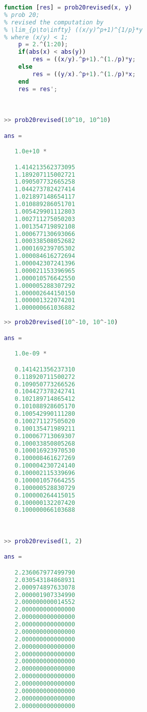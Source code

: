 \begin{lstlisting}[language = MATLAB]
function [res] = prob20revised(x, y)
% prob 20;
% revised the computation by 
% \lim_{p\to\infty} ((x/y)^p+1)^{1/p}*y
% where (x/y) < 1;
    p = 2.^(1:20);
    if(abs(x) < abs(y))
        res = ((x/y).^p+1).^(1./p)*y;
    else
        res = ((y/x).^p+1).^(1./p)*x;
    end
    res = res';
\end{lstlisting}
\\
\begin{minipage}{0.5\textwidth}
\begin{lstlisting}[language = MATLAB]
>> prob20revised(10^10, 10^10)

ans =

   1.0e+10 *

   1.414213562373095
   1.189207115002721
   1.090507732665258
   1.044273782427414
   1.021897148654117
   1.010889286051701
   1.005429901112803
   1.002711275050203
   1.001354719892108
   1.000677130693066
   1.000338508052682
   1.000169239705302
   1.000084616272694
   1.000042307241396
   1.000021153396965
   1.000010576642550
   1.000005288307292
   1.000002644150150
   1.000001322074201
   1.000000661036882
\end{lstlisting}
\end{minipage}
\hspace{10pt}
\begin{minipage}{0.5\textwidth}
\begin{lstlisting}[language = MATLAB]
>> prob20revised(10^-10, 10^-10)

ans =

   1.0e-09 *

   0.141421356237310
   0.118920711500272
   0.109050773266526
   0.104427378242741
   0.102189714865412
   0.101088928605170
   0.100542990111280
   0.100271127505020
   0.100135471989211
   0.100067713069307
   0.100033850805268
   0.100016923970530
   0.100008461627269
   0.100004230724140
   0.100002115339696
   0.100001057664255
   0.100000528830729
   0.100000264415015
   0.100000132207420
   0.100000066103688
\end{lstlisting}
\end{minipage}
\\
\begin{lstlisting}[language = MATLAB]
>> prob20revised(1, 2)

ans =

   2.236067977499790
   2.030543184868931
   2.000974897633078
   2.000001907334990
   2.000000000014552
   2.000000000000000
   2.000000000000000
   2.000000000000000
   2.000000000000000
   2.000000000000000
   2.000000000000000
   2.000000000000000
   2.000000000000000
   2.000000000000000
   2.000000000000000
   2.000000000000000
   2.000000000000000
   2.000000000000000
   2.000000000000000
\end{lstlisting}

